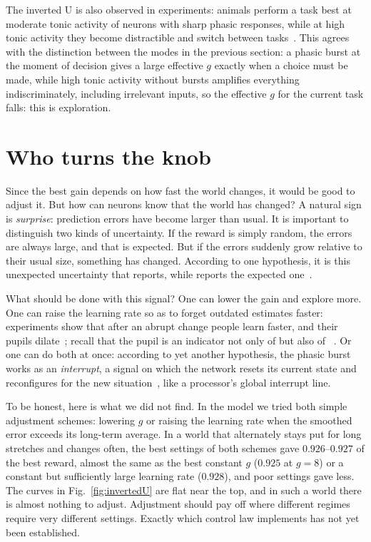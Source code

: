 The inverted U is also observed in experiments: animals perform a task best at moderate tonic activity of  neurons with sharp phasic responses, while at high tonic activity they become distractible and switch between tasks~\cite{AstonJones2005}. This agrees with the distinction between the modes in the previous section: a phasic burst at the moment of decision gives a large effective $g$ exactly when a choice must be made, while high tonic activity without bursts amplifies everything indiscriminately, including irrelevant inputs, so the effective $g$ for the current task falls: this is exploration.

\section{Who turns the knob}

Since the best gain depends on how fast the world changes, it would be good to adjust it. But how can  neurons know that the world has changed? A natural sign is \emph{surprise}: prediction errors have become larger than usual. It is important to distinguish two kinds of uncertainty. If the reward is simply random, the errors are always large, and that is expected. But if the errors suddenly grow relative to their usual size, something has changed. According to one hypothesis, it is this unexpected uncertainty that  reports, while  reports the expected one~\cite{YuDayan2005}.

What should be done with this signal? One can lower the gain and explore more. One can raise the learning rate so as to forget outdated estimates faster: experiments show that after an abrupt change people learn faster, and their pupils dilate~\cite{Nassar2012}; recall that the pupil is an indicator not only of  but also of ~\cite{Reimer2016}. Or one can do both at once: according to yet another hypothesis, the phasic  burst works as an \emph{interrupt}, a signal on which the network resets its current state and reconfigures for the new situation~\cite{BouretSara2005}, like a processor's global interrupt line.

To be honest, here is what we did not find. In the model we tried both simple adjustment schemes: lowering $g$ or raising the learning rate when the smoothed error exceeds its long-term average. In a world that alternately stays put for long stretches and changes often, the best settings of both schemes gave $0.926$--$0.927$ of the best reward, almost the same as the best constant $g$ ($0.925$ at $g=8$) or a constant but sufficiently large learning rate ($0.928$), and poor settings gave less. The curves in Fig.~\ref{fig:invertedU} are flat near the top, and in such a world there is almost nothing to adjust. Adjustment should pay off where different regimes require very different settings. Exactly which control law  implements has not yet been established.

